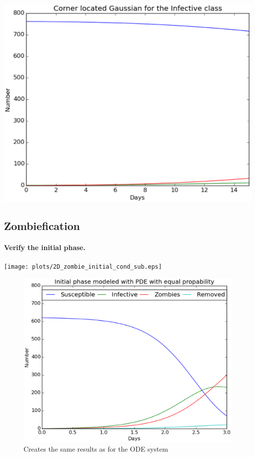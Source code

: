 \documentclass[%
twoside,                 %
final,                   %
10pt]{article}
\begin{document}
\begin{center}  %
  \centerline{\includegraphics[width=0.8\linewidth]{plots/2D_british_school_gauss_corner_long_number.eps}}
\end{center}


\subsection{Zombiefication}
\paragraph{Verify the initial phase.}
\begin{center}  %
  \centerline{\texttt{[image: plots/2D\_zombie\_initial\_cond\_sub.eps]}}
\end{center}



\begin{figure}[ht]
  \centerline{\includegraphics[width=0.8\linewidth]{plots/2D_zombie_initial_cond_number.eps}}
  \caption{
  Creates the same results as for the ODE system
  }
\end{figure}
\end{document}
